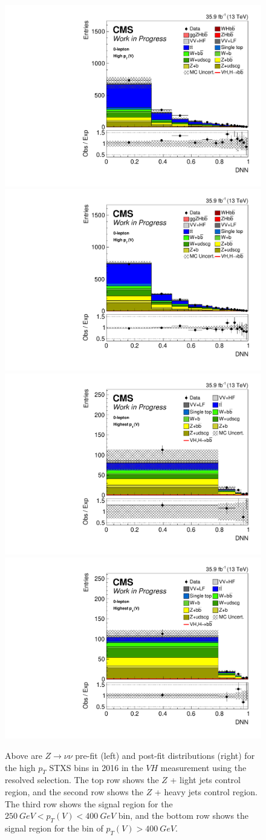 \begin{figure}
  \includegraphics[width=0.35\linewidth]{figures/210322_STXSfine_400split_unblinded_Xbb_025349b6_postfitplots/plot_shapes_vhbb_Znn_21_13TeV2016_prefit.pdf}
  \includegraphics[width=0.35\linewidth]{figures/210322_STXSfine_400split_unblinded_Xbb_025349b6_postfitplots/plot_shapes_vhbb_Znn_21_13TeV2016_postfit.pdf} \\
  \includegraphics[width=0.35\linewidth]{figures/210322_STXSfine_400split_unblinded_Xbb_025349b6_postfitplots/plot_shapes_vhbb_Znn_23_13TeV2016_prefit.pdf}
  \includegraphics[width=0.35\linewidth]{figures/210322_STXSfine_400split_unblinded_Xbb_025349b6_postfitplots/plot_shapes_vhbb_Znn_23_13TeV2016_postfit.pdf} \\
  \caption[$Z\rightarrow \nu\nu$ $V\!H$ distributions for high $p_T$ in 2016]{
    Above are $Z\rightarrow \nu\nu$ pre-fit (left) and post-fit distributions (right)
    for the high $p_T$ STXS bins in 2016 in the $V\!H$ measurement using the resolved selection.
    The top row shows the $Z$ + light jets control region, and
    the second row shows the $Z$ + heavy jets control region.
    The third row shows the signal region for the $\SI{250}{GeV} < p_T(V) < \SI{400}{GeV}$ bin,
    and the bottom row shows the signal region for the bin of $p_T(V) > \SI{400}{GeV}$.
  }
  \label{fig:vh-znn-high-2016}
\end{figure}
